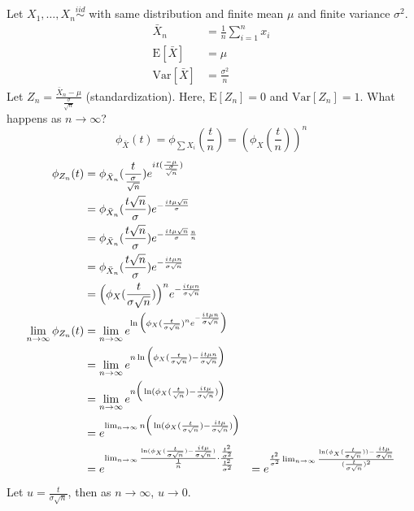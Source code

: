 \documentclass[12pt]{article}
\newcommand{\iid}{\stackrel{iid}{\sim}}
\newcommand{\expected}[1]{\mathrm{E}[#1]}
\newcommand{\variance}[1]{\mathrm{Var}[#1]}
\renewcommand{\i}{{i\mkern1mu}}
\begin{document}
Let $X_1, \dots, X_n \iid$ with same distribution and finite mean $\mu$ and finite variance $\sigma^2$. $$ \begin{aligned} \bar{X}_n &= \frac{1}{n} \sum_{i = 1}^n x_i \\ \expected{\bar{X}} &= \mu \\ \variance{\bar{X}} &= \frac{\sigma^2}{n} \end{aligned} $$ 
Let $Z_n = \frac{\bar{X}_n - \mu}{\frac{\sigma}{\sqrt{n}}}$ (standardization). Here, $\expected{Z_n} = 0$ and $\variance{Z_n} = 1$. What happens as $ n \to \infty$? 
$$ \phi_{\bar{X}}(t) = \phi_{\sum X_i} (\frac{t}{n}) = ( \phi_X(\frac{t}{n}))^n$$ 
$$ \begin{aligned} \phi_{Z_n}(t) &= \phi_{\bar{X}_n} (\frac{t}{\frac{\sigma}{\sqrt{n}}})e^{\i t(\frac{-\mu}{\frac{\sigma}{\sqrt{n}}})} \\ &= \phi_{\bar{X}_n} (\frac{t\sqrt{n}}{\sigma})e^{-\frac{\i t \mu \sqrt{n}}{\sigma}} \\ &= \phi_{\bar{X}_n} (\frac{t\sqrt{n}}{\sigma}) e^{-\frac{\i t \mu \sqrt{n}}{\sigma} \frac{n}{n}} \\ &= \phi_{\bar{X}_n} (\frac{t\sqrt{n}}{\sigma}) e^{-\frac{\i t \mu n}{\sigma \sqrt{n}}} \\ &= \Big( \phi_X (\frac{t}{\sigma \sqrt{n}}) \Big)^n e^{-\frac{\i t \mu n}{\sigma \sqrt{n}}} \\ \lim_{n \to \infty} \phi_{Z_n}(t) &= \lim_{n \to \infty} e^{\ln\Big( \phi_X(\frac{t}{\sigma \sqrt{n}})^n e^{-\frac{\i t \mu n}{\sigma \sqrt{n}}}\Big)} \\ &= \lim_{n \to \infty} e^{n \ln \Big( \phi_X(\frac{t}{\sigma \sqrt{n}}) - \frac{\i t \mu n}{\sigma \sqrt{n}}\Big)} \\ &= \lim_{n \to \infty} e^{n\Big( \ln (\phi_X(\frac{t}{\sqrt{n}}) - \frac{\i t \mu}{\sigma \sqrt{n}}) \Big)} \\ &= e^{\lim_{n \to \infty} n \Big( \ln (\phi_X (\frac{t}{\sigma \sqrt{n}}) - \frac{\i t \mu}{\sigma \sqrt{n}}) \Big) } \\ &= e^{\lim_{n \to \infty} \frac{\ln (\phi_X(\frac{t}{\sigma \sqrt{n}}) - \frac{\i t \mu}{\sigma \sqrt{n}})}{\frac{1}{n}} \cdot \frac{\frac{t^2}{\sigma^2}}{\frac{t^2}{\sigma^2}}} &= e^{\frac{t^2}{\sigma^2} \lim_{n \to \infty} \frac{\ln (\phi_X(\frac{t}{\sigma \sqrt{n}})) - \frac{\i t\mu}{\sigma \sqrt{n}}}{( \frac{t}{\sigma \sqrt{n}})^2}} \end{aligned} $$ 
Let $u = \frac{t}{\sigma \sqrt{n}}$, then as $n \to \infty$, $u \to 0$. 
\end{document}
